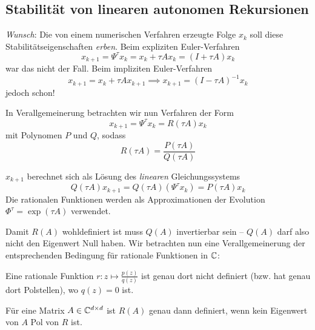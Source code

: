 \subsection{Stabilität von linearen autonomen Rekursionen}

\emph{Wunsch}: Die von einem numerischen Verfahren erzeugte Folge $x_k$ soll diese Stabilitätseigenschaften \textit{erben}. Beim expliziten Euler-Verfahren \begin{equation*}
	x_{k+1}=\Psi^{\tau} x_k=x_k+\tau Ax_k=\left(I+\tau A \right)x_k
\end{equation*}
war das nicht der Fall. Beim impliziten Euler-Verfahren
\begin{equation*}
 x_{k+1}=x_k+\tau Ax_{k+1} \implies x_{k+1}=\left(I-\tau A \right)^{-1} x_k
\end{equation*}
jedoch schon!

In Verallgemeinerung betrachten wir nun Verfahren der Form
\begin{equation*}
	x_{k+1}=\Psi^{\tau}x_k=R \left(\tau A \right)x_k
\end{equation*}
mit Polynomen $P$ und $Q$, sodass
\begin{equation*}
	R (\tau A)=\frac{P (\tau A)}{Q (\tau A)}
\end{equation*}

$x_{k+1}$ berechnet sich als Lösung des \textit{linearen} Gleichungssystems
\begin{equation*}
	Q(\tau A)x_{k+1} = Q(\tau A) (\Psi^{\tau} x_k) = P (\tau A) x_k
\end{equation*}
Die rationalen Funktionen werden als Approximationen der Evolution $\Phi^{\tau}=\exp (\tau A)$ verwendet.


Damit $R(A)$ wohldefiniert ist muss $Q(A)$ invertierbar sein -- $Q(A)$ darf also nicht den Eigenwert Null haben.
Wir betrachten nun eine Verallgemeinerung der entsprechenden Bedingung für rationale Funktionen in $\mathbb C$:

\begin{lemma}
	Eine rationale Funktion $r \colon z \mapsto \frac{p(z)}{q(z)}$ ist genau dort nicht definiert (bzw. hat genau dort Polstellen), wo $q(z) = 0$ ist.
\end{lemma}

\begin{satz}
	Für eine Matrix $A \in \mathbb C^{d \times d}$ ist $R(A)$ genau dann definiert, wenn kein Eigenwert von $A$ Pol von $R$ ist.
\end{satz}



